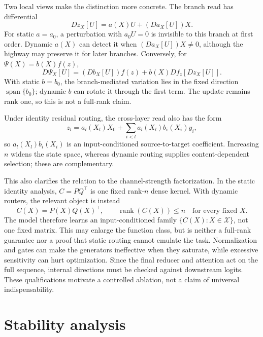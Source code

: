 \documentclass{article}
\begin{document}
Two local views make the distinction more concrete. The branch read has differential
\begin{equation}
 Dz_X[U]=a(X)U+(Da_X[U])X.
 \label{eq:dynamic-read-differential}
\end{equation}
For static $a=a_0$, a perturbation with $a_0U=0$ is invisible to this branch at first order. Dynamic $a(X)$ can detect it when $(Da_X[U])X\ne0$, although the highway may preserve it for later branches. Conversely, for $\Psi(X)=b(X)f(z)$,
\begin{equation}
 D\Psi_X[U]=(Db_X[U])f(z)+b(X)Df_z[Dz_X[U]].
 \label{eq:dynamic-write-differential}
\end{equation}
With static $b=b_0$, the branch-mediated variation lies in the fixed direction $\operatorname{span}\{b_0\}$; dynamic $b$ can rotate it through the first term. The update remains rank one, so this is not a full-rank claim.

Under identity residual routing, the cross-layer read also has the form
\begin{equation}
 z_l=a_l(X_l)X_0+\sum_{i<l}a_l(X_l)b_i(X_i)y_i,
 \label{eq:dynamic-cross-layer}
\end{equation}
so $a_l(X_l)b_i(X_i)$ is an input-conditioned source-to-target coefficient. Increasing $n$ widens the state space, whereas dynamic routing supplies content-dependent selection; these are complementary.

This also clarifies the relation to the channel-strength factorization. In the static identity analysis, $C=PQ^\top$ is one fixed rank-$n$ dense kernel. With dynamic routers, the relevant object is instead
\begin{equation}
 C(X)=P(X)Q(X)^\top,\qquad \operatorname{rank}(C(X))\leq n
 \quad\text{for every fixed }X.
 \label{eq:dynamic-channel-family}
\end{equation}
The model therefore learns an input-conditioned family $\{C(X):X\in\mathcal X\}$, not one fixed matrix. This may enlarge the function class, but is neither a full-rank guarantee nor a proof that static routing cannot emulate the task. Normalization and gates can make the generators ineffective when they saturate, while excessive sensitivity can hurt optimization. Since the final reducer and attention act on the full sequence, internal directions must be checked against downstream logits. These qualifications motivate a controlled ablation, not a claim of universal indispensability.


\section{Stability analysis}
\end{document}
